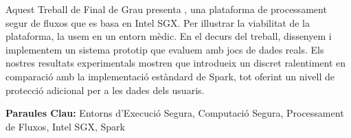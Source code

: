 Aquest Treball de Final de Grau presenta \projName, una plataforma de processament segur de fluxos que es basa en Intel SGX.
Per il{\tiny\raisebox{.9ex}{\textbullet}}lustrar la viabilitat de la plataforma, la usem en un entorn m\`edic.
En el decurs del treball, dissenyem i implementem un sistema prototip que evaluem amb jocs de dades reals.
Els nostres resultats experimentals mostren que \projName introdueix un discret ralentiment en comparaci\'o amb la implementaci\'o est\`andard de Spark, tot oferint un nivell de protecci\'o adicional per a les dades dels usuaris. 

\vspace{0.5cm}

\textbf{Paraules Clau:} Entorns d'Execuci\'o Segura, Computaci\'o Segura, Processament de Fluxos, Intel SGX, Spark

\vfill
